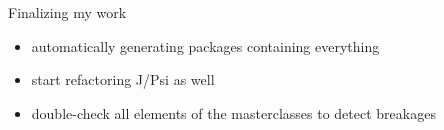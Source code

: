 \documentclass[aspectratio=169,14pt,dvipsnames]{beamer}
\begin{document}
\begin{frame}[noframenumbering]{}
  \begin{center}
    \textbf{}
  \end{center}
\end{frame}

\begin{frame}[noframenumbering]{Finalizing my work}
  \begin{itemize}
    \item automatically generating packages containing everything
    \item start refactoring J/Psi as well
    \item double-check all elements of the masterclasses to detect breakages
  \end{itemize}
\end{frame}
\end{document}
